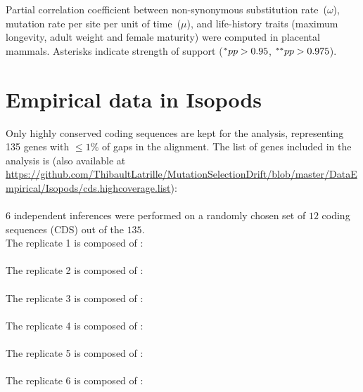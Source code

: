 \documentclass{article}
\begin{document}
	\begin{table}[H]
		
		\caption[Partial correlation coefficient matrix in mammals ($\omega$)]{
		Partial correlation coefficient between {non-synonymous} {substitution} rate~($\omega$), mutation rate per site per unit of time~($\mu$), and life-history traits (maximum longevity, adult weight and female maturity) were computed in placental mammals.
		Asterisks indicate strength of support ($\smash{^{*}} pp > 0.95$, $\smash{^{**}} pp > 0.975$).}
	\end{table}


	\section{Empirical data in Isopods}
	\label{sec:empirical-data-in-isopods}

	Only highly conserved coding sequences are kept for the analysis, representing 135 {genes} with $\leq 1\%$ of gaps in the alignment.
	The list of genes included in the analysis is (also available at \url{https://github.com/ThibaultLatrille/MutationSelectionDrift/blob/master/DataEmpirical/Isopods/cds.highcoverage.list}):\\
	 \\

	$6$ independent inferences were performed on a randomly chosen set of $12$ coding sequences ({CDS}) out of the $135$.\\

	The replicate 1 is composed of :\\
	\\

	The replicate 2 is composed of :\\
	 \\

	The replicate 3 is composed of :\\
	\\

	The replicate 4 is composed of :\\
	\\

	The replicate 5 is composed of :\\
	\\

	The replicate 6 is composed of :\\
	
\end{document}
